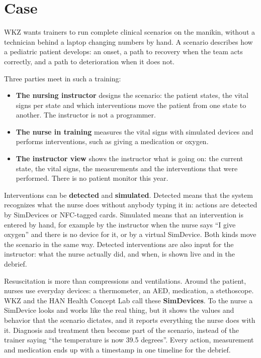 \documentclass[11pt,a4paper]{article}
\begin{document}
\section{Case}
WKZ wants trainers to run complete clinical scenarios on the manikin,
without a technician behind a laptop changing numbers by hand. A scenario
describes how a pediatric patient develops: an onset, a path to recovery when
the team acts correctly, and a path to deterioration when it does not.

Three parties meet in such a training:
\begin{itemize}
  \item \textbf{The nursing instructor} designs the scenario: the patient
        states, the vital signs per state and which interventions move the
        patient from one state to another. The instructor is not a programmer.
  \item \textbf{The nurse in training} measures the vital signs with
        simulated devices and performs interventions, such as giving a
        medication or oxygen.
  \item \textbf{The instructor view} shows the instructor what is going on:
        the current state, the vital signs, the measurements and the
        interventions that were performed. There is no patient monitor this
        year.
\end{itemize}

Interventions can be \textbf{detected} and \textbf{simulated}. Detected means
that the system recognizes what the nurse does without anybody typing it in:
actions are detected by SimDevices or NFC-tagged cards. Simulated means that an intervention is entered by hand,
for example by the instructor when the nurse says ``I give oxygen'' and there is
no device for it, or by a virtual SimDevice. Both kinds move the scenario in
the same way. Detected interventions are also input for the instructor: what
the nurse actually did, and when, is shown live and in the debrief.

Resuscitation is more than compressions and ventilations. Around the patient,
nurses use
everyday devices: a thermometer, an AED, medication, a stethoscope. WKZ and the
HAN Health Concept Lab call these \textbf{SimDevices}. To the nurse a SimDevice
looks and works like the real thing, but it shows the values and behavior that
the scenario dictates, and it reports everything the nurse does with it.
Diagnosis and treatment then become part of the scenario, instead of the
trainer saying ``the temperature is now 39.5 degrees''. Every action,
measurement and medication ends up with a timestamp in one timeline for the
debrief.
\end{document}
